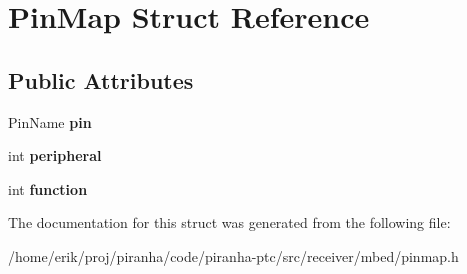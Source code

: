 \hypertarget{structPinMap}{}\section{Pin\+Map Struct Reference}
\label{structPinMap}
\subsection*{Public Attributes}
\begin{DoxyCompactItemize}
\item 
Pin\+Name {\bfseries pin}\hypertarget{structPinMap_a86114430d2d44af0912d6568879191a0}{}\label{structPinMap_a86114430d2d44af0912d6568879191a0}

\item 
int {\bfseries peripheral}\hypertarget{structPinMap_aff228d741b54c3680ec5c4b92160e1c7}{}\label{structPinMap_aff228d741b54c3680ec5c4b92160e1c7}

\item 
int {\bfseries function}\hypertarget{structPinMap_ad687defa2b4b2f7cf455677b5806bd82}{}\label{structPinMap_ad687defa2b4b2f7cf455677b5806bd82}

\end{DoxyCompactItemize}


The documentation for this struct was generated from the following file\+:\begin{DoxyCompactItemize}
\item 
/home/erik/proj/piranha/code/piranha-\/ptc/src/receiver/mbed/pinmap.\+h\end{DoxyCompactItemize}
